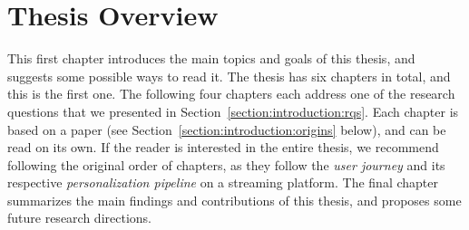 
\section{Thesis Overview}
\label{section:introduction:overview}



This first chapter introduces the main topics and goals of this thesis, and suggests some possible ways to read it. The thesis has six chapters in total, and this is the first one. The following four chapters each address one of the research questions that we presented in Section~\ref{section:introduction:rqs}. Each chapter is based on a paper (see Section~\ref{section:introduction:origins} below), and can be read on its own. If the reader is interested in the entire thesis, we recommend following the original order of chapters, as they follow the \emph{user journey} and its respective \emph{personalization pipeline} on a streaming platform. The final chapter summarizes the main findings and contributions of this thesis, and proposes some future research directions.

